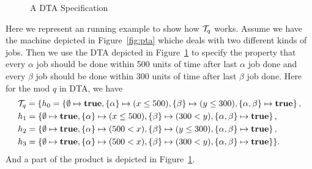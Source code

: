 \begin{figure}
    \centering
    \resizebox{.5\textwidth}{!}{
        
        }
    \caption{A DTA Specification}
    \label{fig:dta}  
\end{figure}
\begin{example}
Here we represent an running example to show how $\mathcal{T}_{q}$ works. 
Assume we have the machine depicted in Figure~\ref{fig:pta}  whiche deals with 
two different kinds of jobs. Then we use the DTA depicted in Figure~\ref{fig:dta} 
to specify the property that every $\alpha$ job should be done within 500 units 
of time after last $\alpha$ job done and every $\beta$ job should be done within 
300 units of time after last $\beta$ job done. Here for 
the mod $q$ in DTA, we have
\begin{align*}
    &
    \mathcal{T}_{q} 
        = \{ 
            h_0 = \left \{
                \emptyset           \mapsto \mathbf{true},
                \{ \alpha \}        \mapsto ( x \le 500 ),
                \{ \beta  \}        \mapsto ( y \le 300 ),
                \{ \alpha, \beta \}  \mapsto \mathbf{true}
            \right \}, 
            \\
            &
            h_1 = \left \{
                \emptyset           \mapsto \mathbf{true},
                \{ \alpha \}        \mapsto ( x \le 500 ),
                \{ \beta  \}        \mapsto ( 300 < y ),
                \{ \alpha, \beta \}  \mapsto \mathbf{true}
            \right \}, 
            \\
            &
            h_2 = \left \{
                \emptyset           \mapsto \mathbf{true},
                \{ \alpha \}        \mapsto ( 500 < x  ),
                \{ \beta  \}        \mapsto ( y \le 300 ),
                \{ \alpha, \beta \}  \mapsto \mathbf{true}
            \right \}, 
            \\
            &
            h_3 = \left \{
                \emptyset           \mapsto \mathbf{true},
                \{ \alpha \}        \mapsto ( 500 < x ),
                \{ \beta  \}        \mapsto ( 300 < y ),
                \{ \alpha, \beta \}  \mapsto \mathbf{true}
            \right \} 
        \} .
\end{align*}
And a part of the product is depicted in Figure~\ref{fig:dta}.

\end{example}


